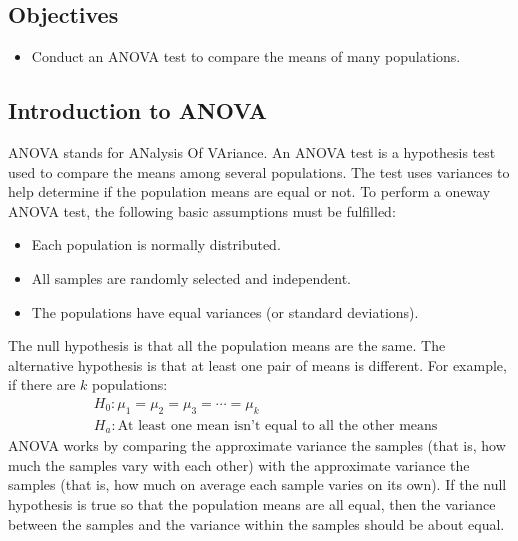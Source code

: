 \documentclass[letterpaper,10pt,english]{jupyterBook}
\begin{document}
\subsection{Objectives}
\label{\detokenize{Ch9 Hypothesis Tests of Two or More Populations/9.3 ANOVA:objectives}}\begin{itemize}
\item {} 
\sphinxAtStartPar
Conduct an ANOVA test to compare the means of many populations.

\end{itemize}


\subsection{Introduction to ANOVA}
\label{\detokenize{Ch9 Hypothesis Tests of Two or More Populations/9.3 ANOVA:introduction-to-anova}}
\sphinxAtStartPar
ANOVA stands for ANalysis Of VAriance. An ANOVA test is a hypothesis test used to compare the means among several populations. The test uses variances to help determine if the population means are equal or not. To perform a one\sphinxhyphen{}way ANOVA test, the following basic assumptions must be fulfilled:
\begin{itemize}
\item {} 
\sphinxAtStartPar
Each population is normally distributed.

\item {} 
\sphinxAtStartPar
All samples are randomly selected and independent.

\item {} 
\sphinxAtStartPar
The populations have equal variances (or standard deviations).

\end{itemize}

\sphinxAtStartPar
The null hypothesis is that all the population means are the same. The alternative hypothesis is that at least one pair of means is different. For example, if there are \(k\) populations:
\begin{align*}
&H_0:\mu_1 = \mu_2 = \mu_3 = \cdots = \mu_k \\
&H_a: \text{At least one mean isn't equal to all the other means}
\end{align*}
\sphinxAtStartPar
ANOVA works by comparing the approximate variance  the samples (that is, how much the samples vary with each other) with the approximate variance  the samples (that is, how much on average each sample varies on its own). If the null hypothesis is true so that the population means are all equal, then the variance between the samples and the variance within the samples should be about equal.
\end{document}
